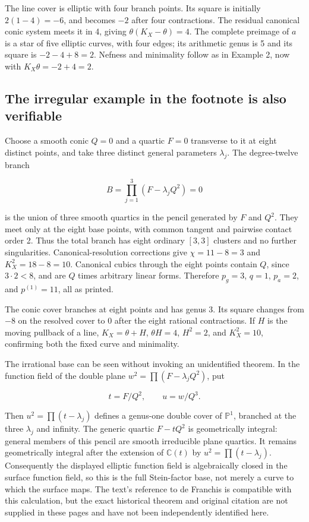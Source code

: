 The line cover is elliptic with four branch points. Its square is initially \(2(1-4)=-6\), and becomes \(-2\) after four contractions. The residual canonical conic system meets it in 4, giving \(\theta(K_X-\theta)=4\). The complete preimage of \(a\) is a star of five elliptic curves, with four edges; its arithmetic genus is 5 and its square is \(-2-4+8=2\). Nefness and minimality follow as in Example 2, now with \(K_X\theta=-2+4=2\).

\subsection{The irregular example in the footnote is also verifiable}

Choose a smooth conic \(Q=0\) and a quartic \(F=0\) transverse to it at eight distinct points, and take three distinct general parameters \(\lambda_j\). The degree-twelve branch

\[
B=\prod_{j=1}^3(F-\lambda_jQ^2)=0
\tag{IV.18.7}
\]

is the union of three smooth quartics in the pencil generated by \(F\) and \(Q^2\). They meet only at the eight base points, with common tangent and pairwise contact order 2. Thus the total branch has eight ordinary \([3,3]\) clusters and no further singularities. Canonical-resolution corrections give \(\chi=11-8=3\) and \(K_X^2=18-8=10\). Canonical cubics through the eight points contain \(Q\), since \(3\cdot 2<8\), and are \(Q\) times arbitrary linear forms. Therefore \(p_g=3\), \(q=1\), \(p_a=2\), and \(p^{(1)}=11\), all as printed.

The conic cover branches at eight points and has genus 3. Its square changes from \(-8\) on the resolved cover to 0 after the eight rational contractions. If \(H\) is the moving pullback of a line, \(K_X=\theta+H\), \(\theta H=4\), \(H^2=2\), and \(K_X^2=10\), confirming both the fixed curve and minimality.

The irrational base can be seen without invoking an unidentified theorem. In the function field of the double plane \(w^2=\prod(F-\lambda_j Q^2)\), put

\[
t=F/Q^2,\qquad u=w/Q^3.
\]

Then \(u^2=\prod(t-\lambda_j)\) defines a genus-one double cover of \(\mathbb P^1\), branched at the three \(\lambda_j\) and infinity. The generic quartic \(F-tQ^2\) is geometrically integral: general members of this pencil are smooth irreducible plane quartics. It remains geometrically integral after the extension of \(\mathbb C(t)\) by \(u^2=\prod(t-\lambda_j)\). Consequently the displayed elliptic function field is algebraically closed in the surface function field, so this is the full Stein-factor base, not merely a curve to which the surface maps. The text's reference to de Franchis is compatible with this calculation, but the exact historical theorem and original citation are not supplied in these pages and have not been independently identified here.

